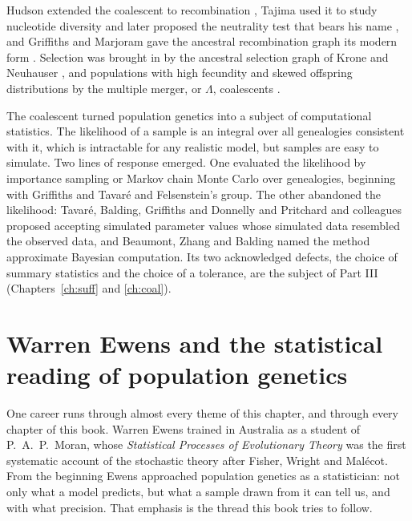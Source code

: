 Hudson extended the coalescent to recombination \citep{intro:hudson1983}, Tajima used it to study
nucleotide diversity \citep{intro:tajima1983} and later proposed the neutrality test that bears his
name \citep{intro:tajima1989}, and Griffiths and Marjoram gave the ancestral recombination graph its
modern form \citep{intro:griffiths1996}. Selection was brought in by the ancestral selection graph
of Krone and Neuhauser \citep{intro:krone1997}, and populations with high fecundity and skewed
offspring distributions by the multiple merger, or $\Lambda$, coalescents \citep{intro:pitman1999}.

The coalescent turned population genetics into a subject of computational statistics. The
likelihood of a sample is an integral over all genealogies consistent with it, which is
intractable for any realistic model, but samples are easy to simulate. Two lines of response
emerged. One evaluated the likelihood by importance sampling or Markov chain Monte Carlo over
genealogies, beginning with Griffiths and Tavar\'e \citep{intro:griffiths1994} and Felsenstein's
group. The other abandoned the likelihood: Tavar\'e, Balding, Griffiths and Donnelly
\citep{intro:tavare1997} and Pritchard and colleagues \citep{intro:pritchard1999} proposed accepting
simulated parameter values whose simulated data resembled the observed data, and Beaumont, Zhang
and Balding \citep{intro:beaumont2002} named the method approximate Bayesian computation. Its two
acknowledged defects, the choice of summary statistics and the choice of a tolerance, are the
subject of Part III (Chapters~\ref{ch:suff} and \ref{ch:coal}).

\section{Warren Ewens and the statistical reading of population genetics}\label{intro:sec:ewens}

One career runs through almost every theme of this chapter, and through every chapter of this
book. Warren Ewens trained in Australia as a student of P.~A.~P.\ Moran, whose \emph{Statistical
Processes of Evolutionary Theory} \citep{intro:moran1962} was the first systematic account of the
stochastic theory after Fisher, Wright and Mal\'ecot. From the beginning Ewens approached population
genetics as a statistician: not only what a model predicts, but what a sample drawn from it can
tell us, and with what precision. That emphasis is the thread this book tries to follow.

